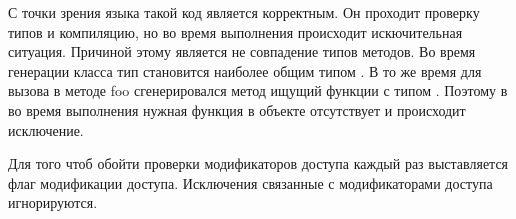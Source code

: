 С точки зрения языка  такой код является корректным. Он проходит проверку типов и компиляцию, но во время выполнения происходит искючительная ситуация. Причиной этому является не совпадение типов методов. Во время генерации класса  тип  становится наиболее общим типом . В то же время для вызова в методе foo сгенерировался метод ищущий функции с типом . Поэтому в во время выполнения нужная функция в объекте  отсутствует и происходит исключение.

Для того чтоб обойти проверки модификаторов доступа каждый раз выставляется флаг модификации доступа. Исключения связанные с модификаторами доступа игнорируются.
